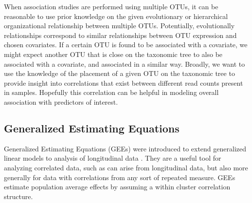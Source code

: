 \documentclass[12pt]{article}
\begin{document}

When association studies are performed using multiple OTUs, it can be reasonable to use prior knowledge on the given evolutionary or hierarchical organizational relationship between multiple OTUs. Potentially, evolutionally relationships correspond to similar relationships between OTU expression and chosen covariates. If a certain OTU is found to be associated with a covariate, we might expect another OTU that is close on the taxonomic tree to  also be associated with a covariate, and associated in a similar way. Broadly, we want to use the knowledge of the placement of a given OTU on the taxonomic tree to provide insight into correlations that exist between different read counts present in samples. Hopefully this correlation can be helpful in modeling overall association with predictors of interest.





\subsection{Generalized Estimating Equations}

Generalized Estimating Equations (GEEs) were introduced to extend generalized linear models to analysis of longitudinal data \cite{liang1986longitudinal}. They are a useful tool for analyzing correlated data, such as can arise from longitudinal data, but also more generally for data with correlations from any sort of repeated measure. GEEs estimate population average effects by assuming a within cluster correlation structure.



\end{document}
